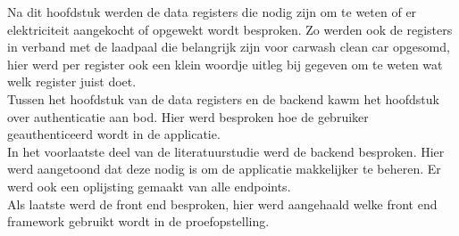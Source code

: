 Na dit hoofdstuk werden de data registers die nodig zijn om te weten of er elektriciteit aangekocht of opgewekt wordt besproken. Zo werden ook de registers in verband met de laadpaal die belangrijk zijn voor carwash clean car opgesomd, hier werd per register ook een klein woordje uitleg bij gegeven om te weten wat welk register juist doet.\\

Tussen het hoofdstuk van de data registers en de backend kawm het hoofdstuk over authenticatie aan bod. Hier werd besproken hoe de gebruiker geauthenticeerd wordt in de applicatie.\\

In het voorlaatste deel van de literatuurstudie werd de backend besproken. Hier werd aangetoond dat deze nodig is om de applicatie makkelijker te beheren. Er werd ook een oplijsting gemaakt van alle endpoints.\\

Als laatste werd de front end besproken, hier werd aangehaald welke front end framework gebruikt wordt in de proefopstelling.